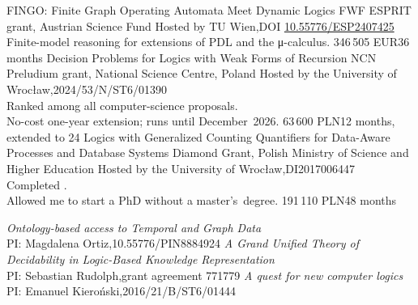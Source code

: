 \documentclass[10pt,a4paper]{article}
\begin{document}
  {FINGO: Finite Graph Operating Automata Meet Dynamic Logics}
  {FWF ESPRIT grant, Austrian Science Fund}
  {Hosted by TU Wien\sep DOI \href{https://www.fwf.ac.at/en/research-radar/10.55776/ESP2407425}{10.55776/ESP2407425}\\
   Finite-model reasoning for extensions of PDL and the μ-calculus.}
  {346\,505 EUR}{36 months}
  {Decision Problems for Logics with Weak Forms of Recursion}
  {NCN Preludium grant, National Science Centre, Poland}
  {Hosted by the University of Wrocław\sep 2024/53/N/ST6/01390\\
   Ranked  among all computer-science proposals.\\
   No-cost one-year extension; runs until December~2026.}
  {63\,600 PLN}{12 months, extended to 24}
  {Logics with Generalized Counting Quantifiers for Data-Aware Processes and Database Systems}
  {Diamond Grant, Polish Ministry of Science and Higher Education}
  {Hosted by the University of Wrocław\sep DI2017006447\\
   Completed .\\
   Allowed me to start a PhD without a master's~degree.}
  {191\,110 PLN}{48 months}
\begin{entries}
  {\emph{Ontology-based access to Temporal and Graph Data}\\PI: Magdalena Ortiz\sep 10.55776/PIN8884924}
  {\emph{A Grand Unified Theory of Decidability in Logic-Based Knowledge Representation}\\PI: Sebastian Rudolph\sep grant agreement 771779}
  {\emph{A quest for new computer logics}\\PI: Emanuel Kieroński\sep 2016/21/B/ST6/01444}
\end{entries}
\end{document}
